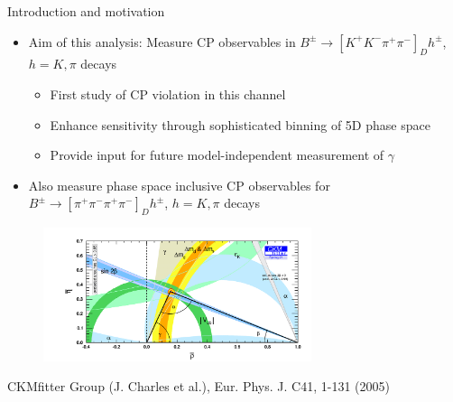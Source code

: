 \documentclass{beamer}
\begin{document}
\begin{frame}{Introduction and motivation}
  \begin{itemize}
    \setlength\itemsep{0.0em}
    \item{Aim of this analysis: Measure CP observables in $B^\pm\to[K^+K^-\pi^+\pi^-]_D h^\pm$, $h = K, \pi$ decays}
    \begin{itemize}
      \setlength\itemsep{0.5em}
      \item{First study of CP violation in this channel}
      \item{Enhance sensitivity through sophisticated binning of 5D phase space}
      \item{Provide input for future model-independent measurement of $\gamma$}
    \end{itemize}
    \item{Also measure phase space inclusive CP observables for $B^\pm\to[\pi^+\pi^-\pi^+\pi^-]_D h^\pm$, $h = K, \pi$ decays}
  \end{itemize}
  \vspace{-0.2cm}
  \begin{figure}
    \includegraphics[width = 0.70\textwidth]{Plots/ckmfitter2.png}
  \end{figure}
  \vspace{-0.5cm}
  \begin{center}
    \tiny{CKMfitter Group (J. Charles et al.), Eur. Phys. J. C41, 1-131 (2005)}
  \end{center}
\end{frame}
\end{document}
